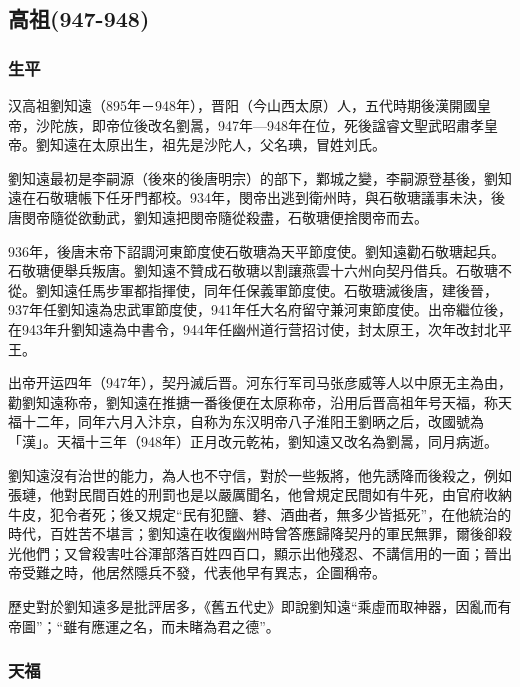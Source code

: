 
\subsection{高祖\tiny(947-948)}

\subsubsection{生平}

汉高祖劉知遠（895年－948年），晋阳（今山西太原）人，五代時期後漢開國皇帝，沙陀族，即帝位後改名劉暠，947年—948年在位，死後諡睿文聖武昭肅孝皇帝。劉知遠在太原出生，祖先是沙陀人，父名琠，冒姓刘氏。

劉知遠最初是李嗣源（後來的後唐明宗）的部下，鄴城之變，李嗣源登基後，劉知遠在石敬瑭帳下任牙門都校。934年，閔帝出逃到衛州時，與石敬瑭議事未決，後唐閔帝隨從欲動武，劉知遠把閔帝隨從殺盡，石敬瑭便捨閔帝而去。

936年，後唐末帝下詔調河東節度使石敬瑭為天平節度使。劉知遠勸石敬瑭起兵。石敬瑭便舉兵叛唐。劉知遠不贊成石敬瑭以割讓燕雲十六州向契丹借兵。石敬瑭不從。劉知遠任馬步軍都指揮使，同年任保義軍節度使。石敬瑭滅後唐，建後晉，937年任劉知遠為忠武軍節度使，941年任大名府留守兼河東節度使。出帝繼位後，在943年升劉知遠為中書令，944年任幽州道行营招讨使，封太原王，次年改封北平王。

出帝开运四年（947年），契丹滅后晋。河东行军司马张彦威等人以中原无主為由，勸劉知遠称帝，劉知遠在推搪一番後便在太原称帝，沿用后晋高祖年号天福，称天福十二年，同年六月入汴京，自称为东汉明帝八子淮阳王劉昞之后，改國號為「漢」。天福十三年（948年）正月改元乾祐，劉知遠又改名為劉暠，同月病逝。

劉知遠沒有治世的能力，為人也不守信，對於一些叛將，他先誘降而後殺之，例如張璉，他對民間百姓的刑罰也是以嚴厲聞名，他曾規定民間如有牛死，由官府收納牛皮，犯令者死；後又規定“民有犯鹽、礬、酒曲者，無多少皆抵死”，在他統治的時代，百姓苦不堪言；劉知遠在收復幽州時曾答應歸降契丹的軍民無罪，爾後卻殺光他們；又曾殺害吐谷渾部落百姓四百口，顯示出他殘忍、不講信用的一面；晉出帝受難之時，他居然隱兵不發，代表他早有異志，企圖稱帝。

歷史對於劉知遠多是批評居多，《舊五代史》即說劉知遠“乘虛而取神器，因亂而有帝圖”；“雖有應運之名，而未睹為君之德”。


\subsubsection{天福}

